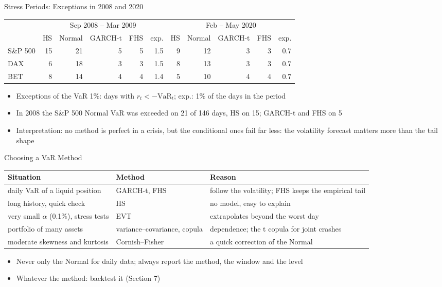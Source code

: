 \begin{frame}{Stress Periods: Exceptions in 2008 and 2020}
\itemsize{\footnotesize}
\begin{center}
\footnotesize
\begin{tabular}{l|rrrr|r|rrrr|r}
\toprule
& \multicolumn{5}{c|}{Sep 2008 -- Mar 2009} & \multicolumn{5}{c}{Feb -- May 2020} \\ & HS & Normal & GARCH-t & FHS & exp. & HS & Normal & GARCH-t & FHS & exp. \\
\midrule
S\&P 500 & 15 & 21 & 5 & 5 & 1.5 & 9 & 12 & 3 & 3 & 0.7 \\
DAX & 6 & 18 & 3 & 3 & 1.5 & 8 & 13 & 3 & 3 & 0.7 \\
BET & 8 & 14 & 4 & 4 & 1.4 & 5 & 10 & 4 & 4 & 0.7 \\
\bottomrule
\end{tabular}
\end{center}
\begin{itemize}
    \item Exceptions of the VaR 1\%: days with $r_t < -\mathrm{VaR}_t$; exp.: 1\% of the days in the period
    \item In 2008 the S\&P 500 Normal VaR was exceeded on 21 of 146 days, HS on 15; GARCH-t and FHS on 5
    \item Interpretation: no method is perfect in a crisis, but the conditional ones fail far less: the volatility forecast matters more than the tail shape
\end{itemize}
\end{frame}

\begin{frame}{Choosing a VaR Method}
\itemsize{\footnotesize}
\begin{center}
\footnotesize
\begin{tabular}{>{\raggedright\arraybackslash}p{3.6cm}>{\raggedright\arraybackslash}p{3.3cm}>{\raggedright\arraybackslash}p{4.0cm}}
\toprule
\textbf{Situation} & \textbf{Method} & \textbf{Reason} \\
\midrule
daily VaR of a liquid position & GARCH-t, FHS & follow the volatility; FHS keeps the empirical tail \\
long history, quick check & HS & no model, easy to explain \\
very small $\alpha$ (0.1\%), stress tests & EVT & extrapolates beyond the worst day \\
portfolio of many assets & variance--covariance, copula & dependence; the t copula for joint crashes \\
moderate skewness and kurtosis & Cornish--Fisher & a quick correction of the Normal \\
\bottomrule
\end{tabular}
\end{center}
\begin{itemize}
    \item Never only the Normal for daily data; always report the method, the window and the level
    \item Whatever the method: backtest it (Section 7)
\end{itemize}
\end{frame}



